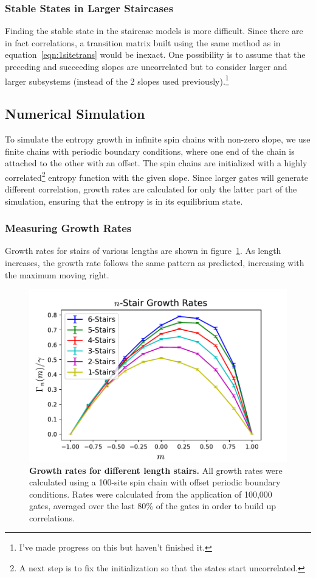 \subsubsection{Stable States in Larger Staircases}  \label{subsub:stairstate}

Finding the stable state in the staircase models is more difficult. Since there are in fact correlations, a transition matrix built using the same method as in equation~\ref{eqn:1sitetrans} would be inexact. One possibility is to assume that the preceding and succeeding slopes are uncorrelated but to consider larger and larger subsystems (instead of the 2 slopes used previously).\footnote{I've made progress on this but haven't finished it.}

\subsection{Numerical Simulation} \label{sub:num}

To simulate the entropy growth in infinite spin chains with non-zero slope, we use finite chains with periodic boundary conditions, where one end of the chain is attached to the other with an offset. The spin chains are initialized with a highly correlated\footnote{A next step is to fix the initialization so that the states start uncorrelated.} entropy function with the given slope. Since larger gates will generate different correlation, growth rates are calculated for only the latter part of the simulation, ensuring that the entropy is in its equilibrium state.

\subsubsection{Measuring Growth Rates}  \label{subsub:growthrates}

Growth rates for stairs of various lengths are shown in figure~\ref{fig:compareRates}. As length increases, the growth rate follows the same pattern as predicted, increasing with the maximum moving right. 
\begin{figure}
	\centering
	\includegraphics[width=.5\textwidth]{compareRates.pdf}
	\caption{\textbf{Growth rates for different length stairs.} All growth rates were calculated using a 100-site spin chain with offset periodic boundary conditions. Rates were calculated from the application of 100,000 gates, averaged over the last 80\% of the gates in order to build up correlations.}
	\label{fig:compareRates}
\end{figure}

